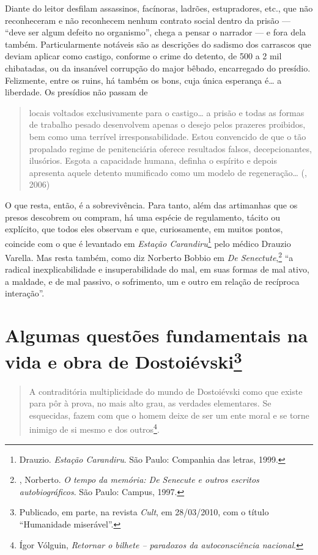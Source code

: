 Diante do leitor desfilam assassinos, facínoras, ladrões,
estupradores, etc., que não reconheceram e não reconhecem
nenhum contrato social dentro da prisão --- ``deve ser algum
defeito no organismo'', chega a pensar o narrador --- e fora
dela também. Particularmente notáveis são as descrições do
sadismo dos carrascos que deviam aplicar como castigo,
conforme o crime do detento, de 500 a 2 mil chibatadas, ou da
insanável corrupção do major bêbado, encarregado do presídio. Felizmente,
entre os ruins, há também os bons, cuja única esperança é\ldots{} a liberdade. Os presídios não passam de

\begin{quote}
locais voltados exclusivamente para o castigo\ldots{} a prisão e todas as formas de trabalho pesado desenvolvem apenas o desejo pelos prazeres proibidos, bem como uma terrível irresponsabilidade. Estou convencido de que o tão propalado regime de penitenciária oferece resultados falsos, decepcionantes, ilusórios. Esgota a capacidade humana, definha o espírito e depois apresenta aquele detento mumificado como um modelo de regeneração\ldots{} (, 2006)
\end{quote}

O que resta, então, é a sobrevivência. Para tanto, além das
artimanhas que os presos descobrem ou compram, há uma espécie
de regulamento, tácito ou explícito, que todos eles observam e
que, curiosamente, em muitos pontos, coincide com o que é
levantado em \emph{Estação Carandiru}\footnote{Drauzio.
\emph{Estação Carandiru}. São Paulo: Companhia das letras, 1999.} pelo
médico Drauzio Varella. Mas resta também, como diz Norberto Bobbio em
\emph{De Senectute},\footnote{, Norberto.
\emph{O tempo da memória: De Senecute e outros escritos
autobiográficos}. São Paulo: Campus, 1997.} ``a radical
inexplicabilidade e insuperabilidade do mal, em suas formas
de mal ativo, a maldade, e de mal passivo, o sofrimento, um
e outro em relação de recíproca interação''.

\chapter{Algumas questões fundamentais na vida e obra de Dostoiévski\footnote{Publicado, em parte, na revista \emph{Cult}, em 28/03/2010, com o título ``Humanidade miserável''.}}

\begin{quote}
A contraditória multiplicidade do mundo de Dostoiévski como
que existe para pôr à prova, no mais alto grau, as verdades
elementares. Se esquecidas, fazem com que o homem deixe de
ser um ente moral e se torne inimigo de si mesmo e dos
outros\footnote{Ígor Vólguin, \emph{Retornar o bilhete -- paradoxos da autoconsciência nacional}.}.
\end{quote}



